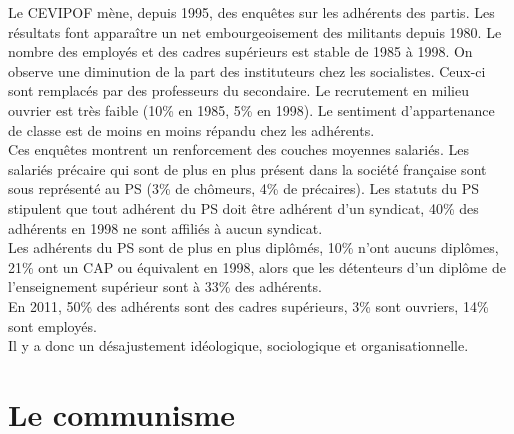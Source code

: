 \documentclass[10pt, a4paper, openany]{book}
\begin{document}
Le CEVIPOF mène, depuis 1995, des enquêtes sur les adhérents des partis. Les résultats font apparaître un net embourgeoisement des militants depuis 1980. Le nombre des employés et des cadres supérieurs est stable de 1985 à 1998. On observe une diminution de la part des instituteurs chez les socialistes. Ceux-ci sont remplacés par des professeurs du secondaire. Le recrutement en milieu ouvrier est très faible (10\% en 1985, 5\% en 1998). Le sentiment d'appartenance de classe est de moins en moins répandu chez les adhérents. \\
Ces enquêtes montrent un renforcement des couches moyennes salariés. Les salariés précaire qui sont de plus en plus présent dans la société française sont sous représenté au PS (3\% de chômeurs, 4\% de précaires). Les statuts du PS stipulent que tout adhérent du PS doit être adhérent d'un syndicat, 40\% des adhérents en 1998 ne sont affiliés à aucun syndicat. \\
Les adhérents du PS sont de plus en plus diplômés, 10\% n'ont aucuns diplômes, 21\% ont un CAP ou équivalent en 1998, alors que les détenteurs d'un diplôme de l'enseignement supérieur sont à 33\% des adhérents. \\
En 2011, 50\% des adhérents sont des cadres supérieurs, 3\% sont ouvriers, 14\% sont employés. \\
Il y a donc un désajustement idéologique, sociologique et organisationnelle. 


\chapter{Le communisme}
\end{document}
